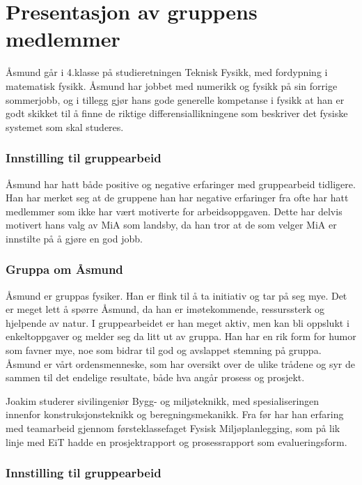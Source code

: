 \chapter{Presentasjon av gruppens medlemmer}
Åsmund går i 4.klasse på studieretningen Teknisk Fysikk, med fordypning 
i matematisk fysikk. Åsmund har jobbet med numerikk og fysikk på sin forrige 
sommerjobb, og i tillegg gjør hans gode generelle kompetanse i fysikk at han 
er godt skikket til å finne de riktige differensiallikningene som beskriver
det fysiske systemet som skal studeres.

\subsection*{Innstilling til gruppearbeid}
Åsmund har hatt både positive og negative erfaringer med gruppearbeid tidligere.
Han har merket seg at de gruppene han har negative erfaringer fra ofte har hatt
medlemmer som ikke har vært motiverte for arbeidsoppgaven. Dette har delvis
motivert hans valg av MiA som landsby, da han tror at de som velger MiA er
innstilte på å gjøre en god jobb.

\subsection*{Gruppa om Åsmund}

Åsmund er gruppas fysiker. Han er flink til å ta initiativ og tar på seg mye.
Det er meget lett å spørre Åsmund, da han er imøtekommende, ressurssterk og
hjelpende av natur. I gruppearbeidet er han meget aktiv, men kan bli oppslukt i enkeltoppgaver og
melder seg da litt ut av gruppa. Han har en rik form for humor som favner
mye, noe som bidrar til god og avslappet stemning på gruppa. Åsmund er vårt
ordensmenneske, som har oversikt over de ulike trådene og syr de sammen til det
endelige resultate, både hva angår prosess og prosjekt.

Joakim studerer sivilingeniør Bygg- og miljøteknikk, med
spesialiseringen innenfor konstruksjonsteknikk og beregningsmekanikk. Fra før
har han erfaring med teamarbeid gjennom førsteklassefaget Fysisk
Miljøplanlegging, som på lik linje med EiT hadde en prosjektrapport og
prosessrapport som evalueringsform.

\subsection*{Innstilling til gruppearbeid}

